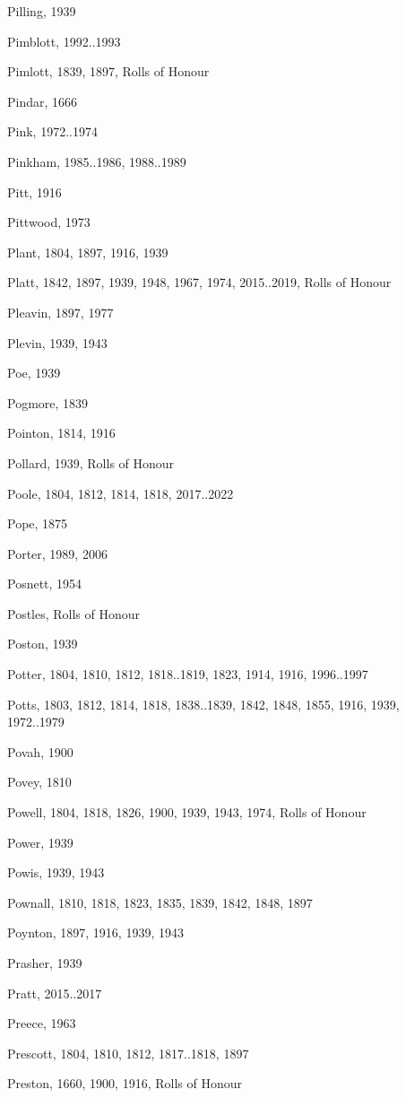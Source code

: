 \begin{theindex}
\item Pilling, 1939
\item Pimblott, 1992..1993
\item Pimlott, 1839, 1897, Rolls of Honour
\item Pindar, 1666
\item Pink, 1972..1974
\item Pinkham, 1985..1986, 1988..1989
\item Pitt, 1916
\item Pittwood, 1973
\item Plant, 1804, 1897, 1916, 1939
\item Platt, 1842, 1897, 1939, 1948, 1967, 1974, 2015..2019, Rolls of Honour
\item Pleavin, 1897, 1977
\item Plevin, 1939, 1943
\item Poe, 1939
\item Pogmore, 1839
\item Pointon, 1814, 1916
\item Pollard, 1939, Rolls of Honour
\item Poole, 1804, 1812, 1814, 1818, 2017..2022
\item Pope, 1875
\item Porter, 1989, 2006
\item Posnett, 1954
\item Postles, Rolls of Honour
\item Poston, 1939
\item Potter, 1804, 1810, 1812, 1818..1819, 1823, 1914, 1916, 1996..1997
\item Potts, 1803, 1812, 1814, 1818, 1838..1839, 1842, 1848, 1855, 1916, 1939, 1972..1979
\item Povah, 1900
\item Povey, 1810
\item Powell, 1804, 1818, 1826, 1900, 1939, 1943, 1974, Rolls of Honour
\item Power, 1939
\item Powis, 1939, 1943
\item Pownall, 1810, 1818, 1823, 1835, 1839, 1842, 1848, 1897
\item Poynton, 1897, 1916, 1939, 1943
\item Prasher, 1939
\item Pratt, 2015..2017
\item Preece, 1963
\item Prescott, 1804, 1810, 1812, 1817..1818, 1897
\item Preston, 1660, 1900, 1916, Rolls of Honour

\end{theindex}
